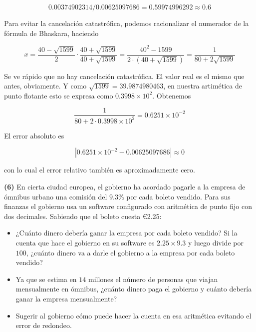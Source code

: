 \documentclass[12pt]{article}
\begin{document}
\begin{equation*}
    0.00374902314/0.00625097686 = 0.59974996292 \approx 0.6
\end{equation*}

Para evitar la cancelación catastrófica, podemos racionalizar el numerador de la
fórmula de Bhaskara, haciendo 

\begin{equation*}
    x = \frac{40 - \sqrt{1599}  }{2} \cdot \frac{40 + \sqrt{1599} }{40 +
    \sqrt{1599} } = \frac{40^2 - 1599}{2 \cdot (40 + \sqrt{1599} )} =
    \frac{1}{80 + 2 \sqrt{1599} }
\end{equation*}

Se ve rápido que no hay cancelación catastrófica. El valor real es 
el mismo que antes, obviamente. Y como $\sqrt{1599} = 39.9874980463 $, en
nuestra artimética de punto flotante esto se expresa como $0.3998 \times 10^2$.
Obtenemos 

\begin{equation*}
    \frac{1}{80 + 2 \cdot 0.3998 \times 10^2 } = 0.6251 \times 10^{-2}
\end{equation*}

El error absoluto es 

\begin{equation*}
    |0.6251 \times 10^{-2} - 0.00625097686| \approx 0
\end{equation*}

con lo cual el error relativo también es aproximadamente cero.

\pagebreak 

\begin{myframe}
    \textbf{(6)} En cierta ciudad europea, el gobierno ha acordado pagarle a la empresa de
ómnibus urbano una comisión del $9.3\%$ por cada boleto vendido. Para sus
finanzas el gobierno usa un software configurado con aritmética de punto fijo
con dos decimales. Sabiendo que el boleto cuesta €2.25:\begin{itemize}\item[a)]
¿Cuánto dinero debería ganar la empresa por cada boleto vendido? Si la cuenta
que hace el gobierno en su software es $2.25 \times 9.3$ y luego divide por
$100$, ¿cuánto dinero va a darle el gobierno a la empresa por cada boleto
vendido?\item[b)] Ya que se estima en $14$ millones el número de personas que
viajan mensualmente en ómnibus, ¿cuánto dinero paga el gobierno y cuánto debería
ganar la empresa mensualmente?\item[c)] Sugerir al gobierno cómo puede hacer la
cuenta en esa aritmética evitando el error de redondeo.\end{itemize}
\end{myframe}
\end{document}
